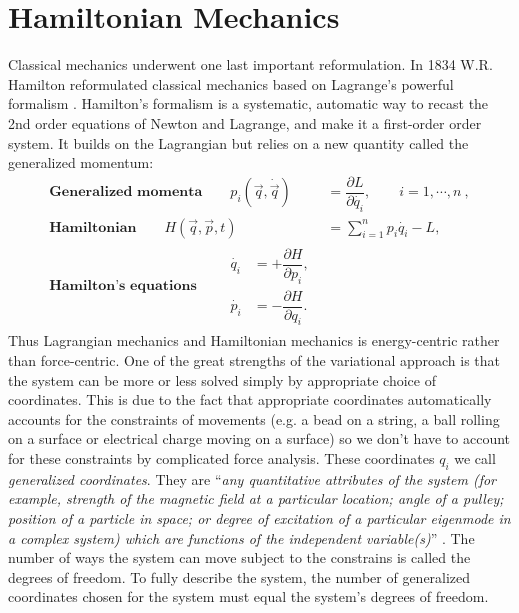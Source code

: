 \section{Hamiltonian Mechanics}
Classical mechanics underwent one last important reformulation. In 1834 W.R. Hamilton reformulated classical mechanics based on Lagrange's powerful formalism \cite[p. 161]{Nakane2002}. Hamilton's formalism is a systematic, automatic way to recast the 2nd order equations of Newton and Lagrange, and make it a first-order order system. It builds on the Lagrangian but relies on a new quantity called the generalized momentum:
\begin{align}
\textbf{Generalized momenta} \qquad p_i(\vec{q},\dot{\vec{q}}) &= \dfrac{\partial L}{\partial \dot{q_i}}, \qquad i = 1,\cdots, n \ , \label{eq:generalized-momenta} \\[1cm]
\textbf{Hamiltonian} \qquad H(\vec{q}, \vec{p}, t) &= \sum\limits_{i=1}^n p_i \dot{q_i} - L \label{eq:hamiltonian}, \\[1cm]
\textbf{Hamilton's equations} \qquad
\begin{split}
\label{eq:hamiltons-equations}
\dot{q_i} &= +\dfrac{\partial H}{\partial p_i} ,
\\[0.2cm]
\dot{p_i} &= -\dfrac{\partial H}{\partial q_i}.
\end{split}
\end{align}
\cite{Hjorth2015} Thus Lagrangian mechanics and Hamiltonian mechanics is energy-centric rather than force-centric. One of the great strengths of the variational approach is that the system can be more or less solved simply by appropriate choice of coordinates. This is due to the fact that appropriate coordinates automatically accounts for the constraints of movements (e.g. a bead on a string, a ball rolling on a surface or electrical charge moving on a surface) so we don't have to account for these constraints by complicated force analysis. These coordinates $q_i$ we call \emph{generalized coordinates}. They are ``\emph{any quantitative attributes of the system (for example, strength of the magnetic field at a particular location; angle of a pulley; position of a particle in space; or degree of excitation of a particular eigenmode in a complex system) which are functions of the independent variable(s)}'' \cite{wiki-lag}. The number of ways the system can move subject to the constrains is called the degrees of freedom. To fully describe the system, the number of generalized coordinates chosen for the system must equal the system's degrees of freedom.

